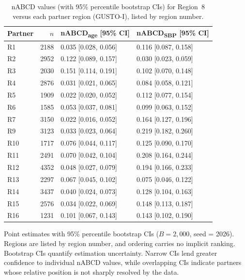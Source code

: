 \documentclass[AMA,Times1COL]{WileyNJDv5}
\begin{document}
\begin{table}[ht]
\centering
\caption{nABCD values (with 95\% percentile bootstrap CIs) for Region~8 versus each partner region (GUSTO-I), listed by region number.\label{tab:gusto_nabcd}}
\begin{tabular}{lrll}
\toprule
\textbf{Partner} & $n$ & \textbf{nABCD\textsubscript{age} [95\% CI]} & \textbf{nABCD\textsubscript{SBP} [95\% CI]} \\
\midrule
R1  & 2188 & 0.035 [0.028, 0.056] & 0.116 [0.087, 0.158] \\
R2  & 2952 & 0.122 [0.089, 0.157] & 0.030 [0.023, 0.059] \\
R3  & 2030 & 0.151 [0.114, 0.191] & 0.102 [0.070, 0.148] \\
R4  & 2876 & 0.031 [0.021, 0.065] & 0.084 [0.058, 0.121] \\
R5  & 1909 & 0.022 [0.020, 0.052] & 0.112 [0.077, 0.154] \\
R6  & 1585 & 0.053 [0.037, 0.081] & 0.099 [0.063, 0.152] \\
R7  & 3150 & 0.022 [0.016, 0.052] & 0.164 [0.127, 0.196] \\
R9  & 3123 & 0.033 [0.023, 0.064] & 0.219 [0.182, 0.260] \\
R10 & 1717 & 0.076 [0.044, 0.117] & 0.125 [0.090, 0.170] \\
R11 & 2491 & 0.070 [0.042, 0.104] & 0.208 [0.164, 0.244] \\
R12 & 4352 & 0.048 [0.027, 0.079] & 0.194 [0.166, 0.233] \\
R13 & 2297 & 0.067 [0.045, 0.102] & 0.075 [0.046, 0.122] \\
R14 & 3437 & 0.040 [0.024, 0.073] & 0.128 [0.104, 0.163] \\
R15 & 2576 & 0.034 [0.022, 0.069] & 0.148 [0.113, 0.187] \\
R16 & 1231 & 0.101 [0.067, 0.143] & 0.143 [0.102, 0.190] \\
\bottomrule
\end{tabular}
\begin{tablenotes}
\item Point estimates with 95\% percentile bootstrap CIs ($B = 2{,}000$, seed = 2026). Regions are listed by region number, and ordering carries no implicit ranking. Bootstrap CIs quantify estimation uncertainty. Narrow CIs lend greater confidence to individual nABCD values, while overlapping CIs indicate partners whose relative position is not sharply resolved by the data.
\end{tablenotes}
\end{table}
\end{document}
